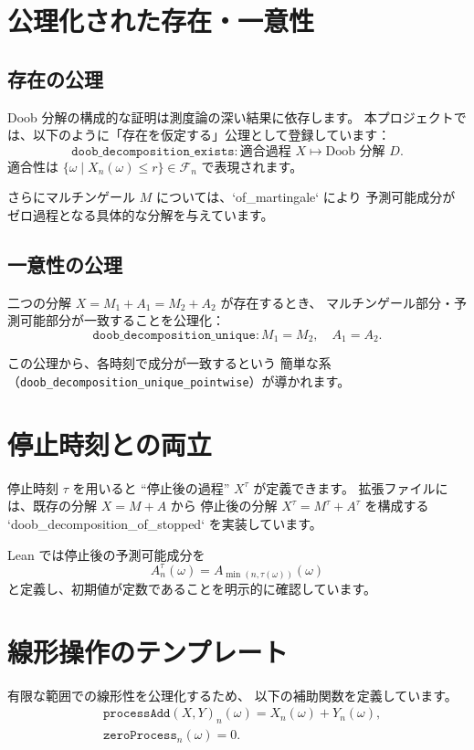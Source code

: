 \documentclass[12pt]{ltjsarticle}
\theoremstyle{definition}
\theoremstyle{plain}
\begin{document}
\section{公理化された存在・一意性}

\subsection{存在の公理}

Doob 分解の構成的な証明は測度論の深い結果に依存します。
本プロジェクトでは、以下のように「存在を仮定する」公理として登録しています：
\[
  \texttt{doob\_decomposition\_exists} :
  \text{適合過程 } X \mapsto \text{Doob 分解 } D.
\]
適合性は $\{ \omega \mid X_n(\omega)\le r\}\in \mathcal{F}_n$ で表現されます。

さらにマルチンゲール $M$ については、`of_martingale` により
予測可能成分がゼロ過程となる具体的な分解を与えています。

\subsection{一意性の公理}

二つの分解 $X = M_1 + A_1 = M_2 + A_2$ が存在するとき、
マルチンゲール部分・予測可能部分が一致することを公理化：
\[
  \texttt{doob\_decomposition\_unique} :
  M_1 = M_2,\quad A_1 = A_2.
\]

この公理から、各時刻で成分が一致するという
簡単な系（\texttt{doob\_decomposition\_unique\_pointwise}）が導かれます。

\section{停止時刻との両立}

停止時刻 $\tau$ を用いると ``停止後の過程'' $X^\tau$ が定義できます。
拡張ファイルには、既存の分解 $X=M+A$ から
停止後の分解 $X^\tau = M^\tau + A^\tau$ を構成する
`doob_decomposition_of_stopped` を実装しています。

Lean では停止後の予測可能成分を
\[
  A^\tau_n(\omega) = A_{\min(n,\tau(\omega))}(\omega)
\]
と定義し、初期値が定数であることを明示的に確認しています。

\section{線形操作のテンプレート}

有限な範囲での線形性を公理化するため、
以下の補助関数を定義しています。
\begin{align*}
  &\texttt{processAdd}(X,Y)_n(\omega) = X_n(\omega) + Y_n(\omega),\\
  &\texttt{zeroProcess}_n(\omega) = 0.
\end{align*}
\end{document}
